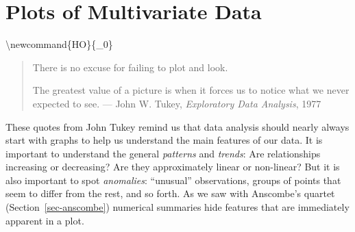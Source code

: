 \documentclass[
  letterpaper,
  10pt,
  krantz2]{krantz}
\begin{document}

\chapter{Plots of Multivariate Data}\label{sec-multivariate_plots}

\renewcommand*{\vec}[1]{\mathbf{#1}}
\newcommand{\trans}{^\mathsf{T}}
\newcommand*{\mat}[1]{\mathbf{#1}}
\newcommand*{\diag}[1]{\mathrm{diag}\, #1}

\renewcommand*{\det}[1]{\mathrm{det}(#1)}
\newcommand*{\rank}[1]{\mathrm{rank} (\mathbf{#1})}
\newcommand*{\trace}[1]{\mathrm{tr} (\mathbf{#1})}
\newcommand*{\dev}[1]{(#1 - \bar{#1})}
\newcommand*{\inv}[1]{\mat{#1}^{-1}}
\newcommand*{\half}[1]{\mat{#1}^{1/2}}
\newcommand*{\invhalf}[1]{\mat{#1}^{-1/2}}
\newcommand*{\nvec}[2]{{#1}_{1}, {#1}_{2},\ldots,{#1}_{#2}}
\newcommand*{\Beta}{\boldsymbol{B}}
\newcommand*{\Epsilon}{\boldsymbol{\Large\varepsilon}}
\newcommand*{\period}{\:\: .}
\newcommand*{\comma}{\:\: ,}
\newcommand*{\given}{\, | \,}
\newcommand*{\Real}[1]{\mathbb{R}^{#1}}
\newcommand*{\degree}[1]{{#1}^{\circ}}

\newcommand{\sizedmat}[2]{\mathord{\mathop{\mat{#1}}\limits_{#2}}}

\renewcommand*{\H}{\mathbf{H}}               
\newcommand*{\E}{\mathbf{E}}
\newcommand*{\widebar}[1]{\overline{#1}}

\newcommand{\Var}{\mathsf{Var}}
\newcommand{\Cov}{\mathsf{Cov}}

\textbackslash newcommand\{HO\}\{\_0\}

\newcommand*{\V}{\mathcal{V}}

\newcommand{\pkg}[1]{\textsf{#1}}
\newcommand{\Rpackage}[1]{\pkg{#1} package}

\begin{quote}
There is no excuse for failing to plot and look.

The greatest value of a picture is when it forces us to notice what we
never expected to see. --- John W. Tukey, \emph{Exploratory Data
Analysis}, 1977
\end{quote}

These quotes from John Tukey remind us that data analysis should nearly
always start with graphs to help us understand the main features of our
data. It is important to understand the general \emph{patterns} and
\emph{trends}: Are relationships increasing or decreasing? Are they
approximately linear or non-linear? But it is also important to spot
\emph{anomalies}: ``unusual'' observations, groups of points that seem
to differ from the rest, and so forth. As we saw with Anscombe's quartet
(Section~\ref{sec-anscombe}) numerical summaries hide features that are
immediately apparent in a plot.
\end{document}
